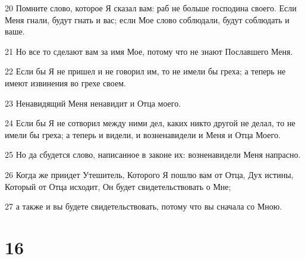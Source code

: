 \par 20 Помните слово, которое Я сказал вам: раб не больше господина своего. Если Меня гнали, будут гнать и вас; если Мое слово соблюдали, будут соблюдать и ваше.
\par 21 Но все то сделают вам за имя Мое, потому что не знают Пославшего Меня.
\par 22 Если бы Я не пришел и не говорил им, то не имели бы греха; а теперь не имеют извинения во грехе своем.
\par 23 Ненавидящий Меня ненавидит и Отца моего.
\par 24 Если бы Я не сотворил между ними дел, каких никто другой не делал, то не имели бы греха; а теперь и видели, и возненавидели и Меня и Отца Моего.
\par 25 Но да сбудется слово, написанное в законе их: возненавидели Меня напрасно.
\par 26 Когда же приидет Утешитель, Которого Я пошлю вам от Отца, Дух истины, Который от Отца исходит, Он будет свидетельствовать о Мне;
\par 27 а также и вы будете свидетельствовать, потому что вы сначала со Мною.

\chapter{16}

